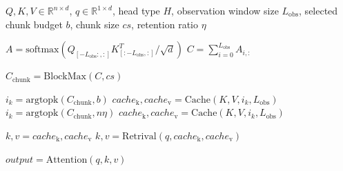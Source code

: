 \begin{algorithm}[tb]
   \caption{CateKV in an individual Head}
   \label{alg:method}
\begin{algorithmic}
    $Q, K, V \in \mathbb{R}^{n \times d}$, $q \in \mathbb{R}^{1 \times d}$, head type $H$, observation window size $L_{\text{obs}}$, selected chunk budget $b$, chunk size $cs$, retention ratio $\eta$
   
   
    \STATE $A = \text{softmax}(Q_{[-L_{\text{obs}}:, :]} K_{[:-L_{\text{obs}}, :]}^T / {\sqrt{d}} )$
   \STATE $C = \sum_{i=0}^{L_{\text{obs}}} A_{i,:}$

   \STATE $C_{\text{chunk}} = \text{BlockMax}(C,cs)$

   
   \STATE $i_k = \text{argtopk}(C_{\text{chunk}},b)$
   \STATE $cache_\text{k}, cache_\text{v} = \text{Cache}(K,V,i_k,L_{\text{obs}})$
   \ELSE
   \STATE $i_k = \text{argtopk}(C_{\text{chunk}},n\eta)$
   \STATE $cache_\text{k}, cache_\text{v} = \text{Cache}(K,V,i_k,L_{\text{obs}})$
   \ENDIF


   
   \STATE $k,v = cache_\text{k}, cache_\text{v}$
   \ELSE
   \STATE $k,v = \text{Retrival}(q, cache_\text{k}, cache_\text{v})$
   
   \ENDIF
   \STATE $output = \text{Attention}(q, k, v)$ 
\end{algorithmic}
\end{algorithm}